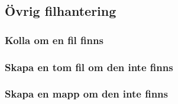 \hypertarget{uxf6vrig-filhantering}{%
\subsection{Övrig filhantering}\label{uxf6vrig-filhantering}}

\hypertarget{kolla-om-en-fil-finns}{%
\subsubsection{Kolla om en fil finns}\label{kolla-om-en-fil-finns}}

\hypertarget{cb9}{}
\begin{Shaded}
\begin{Highlighting}[]
\OperatorTok{=}  \OperatorTok{(}\OperatorTok{);}
\OperatorTok{(}\OperatorTok{())\{}
    \OperatorTok{(}\OperatorTok{);}
\OperatorTok{\}}
\end{Highlighting}
\end{Shaded}

\hypertarget{skapa-en-tom-fil-om-den-inte-finns}{%
\subsubsection{Skapa en tom fil om den inte
finns}\label{skapa-en-tom-fil-om-den-inte-finns}}

\hypertarget{cb10}{}
\begin{Shaded}
\begin{Highlighting}[]
\OperatorTok{=}  \OperatorTok{(}\OperatorTok{);}
\OperatorTok{(!}\OperatorTok{())\{}
\OperatorTok{();}
\OperatorTok{\}}
\end{Highlighting}
\end{Shaded}

\hypertarget{skapa-en-mapp-om-den-inte-finns}{%
\subsubsection{Skapa en mapp om den inte
finns}\label{skapa-en-mapp-om-den-inte-finns}}

